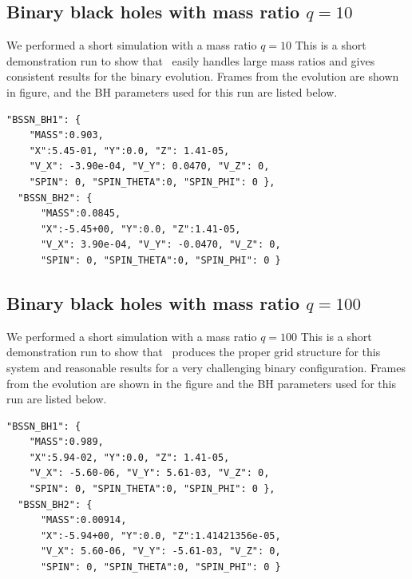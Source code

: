 \subsection{Binary black holes with mass ratio $q=10$}

We performed a short simulation with a mass ratio $q=10$
This is a short demonstration run to show that \dendro\
easily handles large mass ratios and gives consistent
results for the binary evolution.
Frames from the evolution are shown in figure,
and the BH parameters used for this run are listed below.

\begin{lstlisting}[basicstyle=\small]
  "BSSN_BH1": {
    "MASS":0.903,
    "X":5.45-01, "Y":0.0, "Z": 1.41-05,
    "V_X": -3.90e-04, "V_Y": 0.0470, "V_Z": 0,
    "SPIN": 0, "SPIN_THETA":0, "SPIN_PHI": 0 },
  "BSSN_BH2": {
      "MASS":0.0845,
      "X":-5.45+00, "Y":0.0, "Z":1.41-05,
      "V_X": 3.90e-04, "V_Y": -0.0470, "V_Z": 0,
      "SPIN": 0, "SPIN_THETA":0, "SPIN_PHI": 0 }
\end{lstlisting}

\subsection{Binary black holes with mass ratio $q=100$}

We performed a short simulation with a mass ratio $q=100$
This is a short demonstration run to show that \dendro\ 
produces the proper grid structure for this system and
reasonable results for a very challenging binary configuration.
Frames from the evolution are shown in the figure
and the BH parameters used for this run are listed below.


\begin{lstlisting}[basicstyle=\small]
  "BSSN_BH1": {
    "MASS":0.989,
    "X":5.94-02, "Y":0.0, "Z": 1.41-05,
    "V_X": -5.60-06, "V_Y": 5.61-03, "V_Z": 0,
    "SPIN": 0, "SPIN_THETA":0, "SPIN_PHI": 0 },
  "BSSN_BH2": {
      "MASS":0.00914,
      "X":-5.94+00, "Y":0.0, "Z":1.41421356e-05,
      "V_X": 5.60-06, "V_Y": -5.61-03, "V_Z": 0,
      "SPIN": 0, "SPIN_THETA":0, "SPIN_PHI": 0 }
\end{lstlisting}
